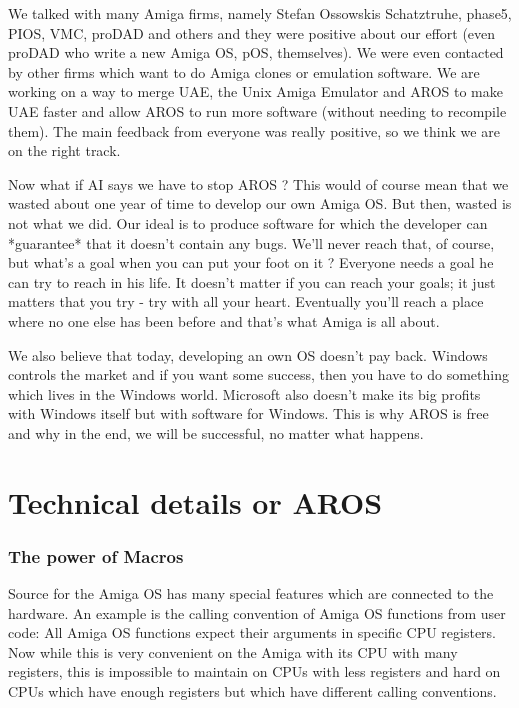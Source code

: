 We talked with many Amiga firms, namely Stefan Ossowskis Schatztruhe,
phase5, PIOS, VMC, proDAD and others and they were positive about our
effort (even proDAD who write a new Amiga OS, pOS, themselves). We were even
contacted by other firms which want to do Amiga clones or emulation
software. We are working on a way to merge UAE, the Unix Amiga Emulator and
AROS to make UAE faster and allow AROS to run more software (without
needing to recompile them). The main feedback from everyone was really
positive, so we think we are on the right track.

Now what if AI says we have to stop AROS ? This would of course mean that
we wasted about one year of time to develop our own Amiga OS. But then,
wasted is not what we did. Our ideal is to produce software for which the
developer can *guarantee* that it doesn't contain any bugs. We'll never
reach that, of course, but what's a goal when you can put your foot on it ?
Everyone needs a goal he can try to reach in his life. It doesn't matter if
you can reach your goals; it just matters that you try - try with all your
heart. Eventually you'll reach a place where no one else has been before
and that's what Amiga is all about.

We also believe that today, developing an own OS doesn't pay back. Windows
controls the market and if you want some success, then you have to do
something which lives in the Windows world. Microsoft also doesn't make
its big profits with Windows itself but with software for Windows. This is
why AROS is free and why in the end, we will be successful, no matter what
happens.

\part{Technical details or AROS}

\section{The power of Macros}

Source for the Amiga OS has many special features which are connected to the
hardware. An example is the calling convention of Amiga OS functions from
user code: All Amiga OS functions expect their arguments in specific CPU
registers. Now while this is very convenient on the Amiga with its CPU with
many registers, this is impossible to maintain on CPUs with less registers
and hard on CPUs which have enough registers but which have different
calling conventions.

